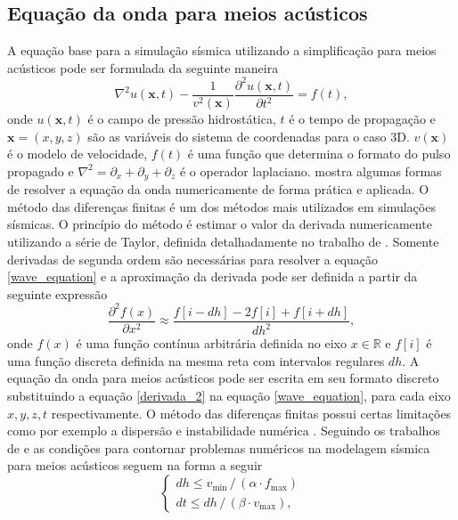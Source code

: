 \subsection*{Equação da onda para meios acústicos}

A equação base para a simulação sísmica utilizando a simplificação para meios acústicos pode ser formulada da seguinte maneira
\begin{equation}
	\nabla^2u(\mathbf{x}, t) - \dfrac{1}{v^2(\mathbf{x})}\dfrac{\partial^2u(\mathbf{x}, t)}{\partial t^2} = f(t),	
	\label{wave_equation}
\end{equation}
\noindent onde $u(\mathbf{x},t)$ é o campo de pressão hidrostática, $t$ é o tempo de propagação e $\mathbf{x} = (x,y,z)$ são as variáveis do sistema de coordenadas para o caso 3D. $v(\mathbf{x})$ é o modelo de velocidade, $f(t)$ é uma função que determina o formato do pulso propagado e $\nabla^2 = \partial_x + \partial_y + \partial_z$ é o operador laplaciano.  mostra algumas formas de resolver a equação da onda numericamente de forma prática e aplicada. O método das diferenças finitas é um dos métodos mais utilizados em simulações sísmicas. O princípio do método é estimar o valor da derivada numericamente utilizando a série de Taylor, definida detalhadamente no trabalho de . Somente derivadas de segunda ordem são necessárias para resolver a equação \ref{wave_equation} e a aproximação da derivada pode ser definida a partir da seguinte expressão
\begin{equation}
	\dfrac{\partial^2 f(x)}{\partial x^2} \approx \dfrac{f[i - dh] - 2f[i] + f[i + dh]}{dh^2},
	\label{derivada_2}
\end{equation}    
\noindent onde $f(x)$ é uma função contínua arbitrária definida no eixo $x \in \mathbb{R}$ e $f[i]$ é uma função discreta definida na mesma reta com intervalos regulares $dh$. A equação da onda para meios acústicos pode ser escrita em seu formato discreto  substituindo a equação \ref{derivada_2} na equação \ref{wave_equation}, para cada eixo $x,y,z,t$ respectivamente. O método das diferenças finitas possui certas limitações como por exemplo a dispersão e instabilidade numérica \cite{aki1980quantitative}. Seguindo os trabalhos de  e  as condições para contornar problemas numéricos na modelagem sísmica para meios acústicos seguem na forma a seguir
\begin{equation}
	\begin{cases}
		dh \le v_{\text{min}} \,/\, (\alpha \cdot f_{\text{max}}) \\
		dt \le dh \,/\, (\beta \cdot v_{\text{max}}),
	\end{cases}
\end{equation}   
